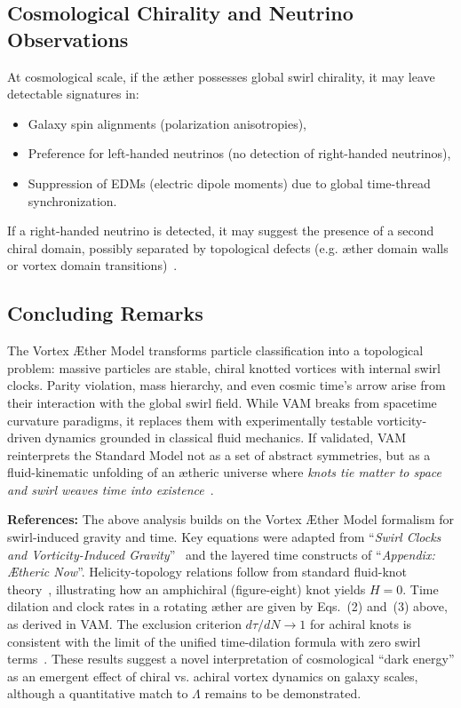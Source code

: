 \documentclass[11pt]{article}
\begin{document}
\subsection*{Cosmological Chirality and Neutrino Observations}

At cosmological scale, if the æther possesses global swirl chirality, it may leave detectable signatures in:
\begin{itemize}
  \item Galaxy spin alignments (polarization anisotropies),
  \item Preference for left-handed neutrinos (no detection of right-handed neutrinos),
  \item Suppression of EDMs (electric dipole moments) due to global time-thread synchronization.
\end{itemize}
If a right-handed neutrino is detected, it may suggest the presence of a second chiral domain, possibly separated by topological defects (e.g. æther domain walls or vortex domain transitions)~\cite{iskandarani2025vam5}.

\subsection*{Concluding Remarks}

The Vortex Æther Model transforms particle classification into a topological problem: massive particles are stable, chiral knotted vortices with internal swirl clocks. Parity violation, mass hierarchy, and even cosmic time’s arrow arise from their interaction with the global swirl field. While VAM breaks from spacetime curvature paradigms, it replaces them with experimentally testable vorticity-driven dynamics grounded in classical fluid mechanics. If validated, VAM reinterprets the Standard Model not as a set of abstract symmetries, but as a fluid-kinematic unfolding of an ætheric universe where \emph{knots tie matter to space and swirl weaves time into existence}~\cite{iskandarani2025vam5}.




    \textbf{References:} The above analysis builds on the Vortex Æther Model formalism for swirl-induced gravity and time. Key equations were adapted from “\textit{Swirl Clocks and Vorticity-Induced Gravity}”~\cite{iskandarani2025vam2} and the layered time constructs of “\textit{Appendix: Ætheric Now}”. Helicity-topology relations follow from standard fluid-knot theory~\cite{knot_theroy_in_fluid}, illustrating how an amphichiral (figure-eight) knot yields $H=0$. Time dilation and clock rates in a rotating æther are given by Eqs.~(2) and~(3) above, as derived in VAM. The exclusion criterion $d\tau/dN\to1$ for achiral knots is consistent with the limit of the unified time-dilation formula with zero swirl terms~\cite{iskandarani2025vam2}. These results suggest a novel interpretation of cosmological “dark energy” as an emergent effect of chiral vs. achiral vortex dynamics on galaxy scales, although a quantitative match to $\Lambda$ remains to be demonstrated.
\end{document}

